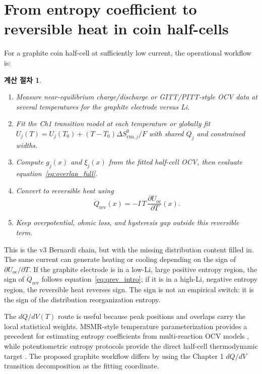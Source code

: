 \documentclass[11pt,a4paper]{article}
\newtheorem*{workbox}{계산 절차}
\newcommand{\rxn}{\mathrm{rxn}}
\newcommand{\rev}{\mathrm{rev}}
\newcommand{\oc}{\mathrm{oc}}
\begin{document}
\section{From entropy coefficient to reversible heat in coin half-cells}
\label{sec:qrev}
For a graphite coin half-cell at sufficiently low current, the operational workflow is:
\begin{workbox}
\begin{enumerate}[leftmargin=1.6em,itemsep=2pt]
\item Measure near-equilibrium charge/discharge or GITT/PITT-style OCV data at several
temperatures for the graphite electrode versus Li.
\item Fit the Ch1 transition model at each temperature or globally fit
$U_j(T)=U_j(T_0)+(T-T_0)\Delta S^0_{\rxn,j}/F$ with shared $Q_j$ and constrained widths.
\item Compute $g_j(x)$ and $\xi_j(x)$ from the fitted half-cell OCV, then evaluate
equation~\eqref{eq:overlap_full}.
\item Convert to reversible heat using
\[
\dot Q_\rev(x)=-I\,T\,\frac{\partial U_\oc}{\partial T}(x).
\]
\item Keep overpotential, ohmic loss, and hysteresis gap outside this reversible term.
\end{enumerate}
\end{workbox}

This is the v3 Bernardi chain, but with the missing distribution content filled in. The
same current can generate heating or cooling depending on the sign of
$\partial U_\oc/\partial T$. If the graphite electrode is in a low-Li, large positive
entropy region, the sign of $\dot Q_\rev$ follows equation~\eqref{eq:qrev_intro}; if it is
in a high-Li, negative entropy region, the reversible heat reverses sign. The sign is not
an empirical switch: it is the sign of the distribution reorganization entropy.

The $dQ/dV(T)$ route is useful because peak positions and overlaps carry the local
statistical weights. MSMR-style temperature parameterization provides a precedent for
estimating entropy coefficients from multi-reaction OCV models \cite{msmr_partI,msmr_partII},
while potentiometric entropy protocols provide the direct half-cell thermodynamic target
\cite{standardised2024}. The proposed graphite workflow differs by using the Chapter 1
$dQ/dV$ transition decomposition as the fitting coordinate.

\end{document}
